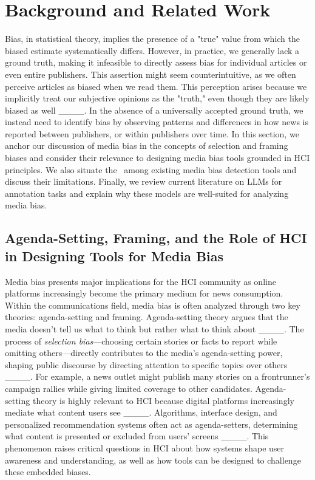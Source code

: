 \section{Background and Related Work}
\label{sec:related_work}

Bias, in statistical theory, implies the presence of a "true" value from which the biased estimate systematically differs. However, in practice, we generally lack a ground truth, making it infeasible to directly assess bias for individual articles or even entire publishers. This assertion might seem counterintuitive, as we often perceive articles as biased when we read them. This perception arises because we implicitly treat our subjective opinions as the "truth," even though they are likely biased as well ____. In the absence of a universally accepted ground truth, we instead need to identify bias by observing patterns and differences in how news is reported between publishers, or within publishers over time. In this section, we anchor our discussion of media bias in the concepts of selection and framing biases and consider their relevance to designing media bias tools grounded in HCI principles. We also situate the \mbd\ among existing media bias detection tools and discuss their limitations. Finally, we review current literature on LLMs for annotation tasks and explain why these models are well-suited for analyzing media bias. 

\subsection{Agenda-Setting, Framing, and the Role of HCI in Designing Tools for Media Bias}
\label{sec:related_work_media_bias}

Media bias presents major implications for the HCI community as online platforms increasingly become the primary medium for news consumption. Within the communications field, media bias is often analyzed through two key theories: agenda-setting and framing. Agenda-setting theory argues that the media doesn't tell us what to think but rather what to think about ____. The process of \emph{selection bias}---choosing certain stories or facts to report while omitting others---directly contributes to the media's agenda-setting power, shaping public discourse by directing attention to specific topics over others ____. For example, a news outlet might publish many stories on a frontrunner's campaign rallies while giving limited coverage to other candidates. Agenda-setting theory is highly relevant to HCI because digital platforms increasingly mediate what content users see ____. Algorithms, interface design, and personalized recommendation systems often act as agenda-setters, determining what content is presented or excluded from users' screens ____. This phenomenon raises critical questions in HCI about how systems shape user awareness and understanding, as well as how tools can be designed to challenge these embedded biases.

